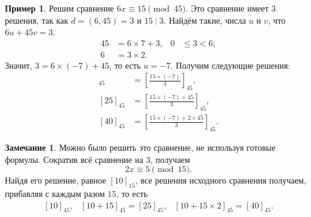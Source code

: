 \documentclass[14pt, a4paper]{extarticle}
\theoremstyle{definition}
\newtheorem*{remark}{Замечание}
\newtheorem{example}{Пример}
\newcommand{\divisible}{\mathop{\vdots}}
\begin{document}
	\begin{example}
		Решим сравнение $6x\equiv15\pmod{45}$. Это сравнение имеет $3$ решения, так как $d=(6,45)=3$ и $15\divisible3$. Найдём такие, числа $u$ и $v$, что $6u+45v=3$.
		\begin{align*}
			45&=6\times7+3,&0&\leqslant3<6;\\
			6&=3\times2.
		\end{align*}
		Значит, $3=6\times(-7)+45$, то есть $u=-7$. Получим следующие решения:
		\begin{align*}
			[10]_{45}&=\left[\frac{15\times(-7)}{3}\right]_{45},\\
			[25]_{45}&=\left[\frac{15\times(-7)+45}{3}\right]_{45},\\
			[40]_{45}&=\left[\frac{15\times(-7)+2\times45}{3}\right]_{45}.
		\end{align*}
	\end{example}
	
	\begin{remark}
		Можно было решить это сравнение, не используя готовые формулы. Сократив всё сравнение на $3$, получаем
		$$2x\equiv5\pmod{15}.$$
		Найдя его решение, равное $[10]_{15}$, все решения исходного сравнения получаем, прибавляя с каждым разом $15$, то есть
		$$\begin{array}{ccc}
			[10]_{45},&[10+15]_{45}=[25]_{45},&[10+15\times2]_{45}=[40]_{45}.
		\end{array}$$
	\end{remark}
	
\end{document}
